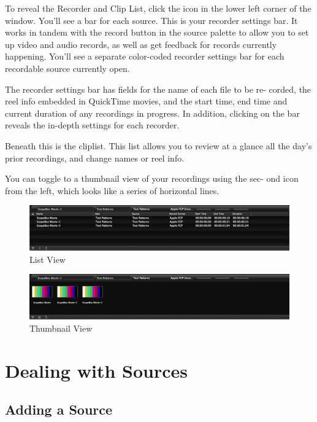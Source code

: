 \documentclass[10,letterpaper,]{report}
\begin{document}
To reveal the Recorder and Clip List, click the icon in the lower left
corner of the window. You'll see a bar for each source. This is your
recorder settings bar. It works in tandem with the record button in the
source palette to allow you to set up video and audio records, as well
as get feedback for records currently happening. You'll see a separate
color-coded recorder settings bar for each recordable source currently
open.

The recorder settings bar has fields for the name of each file to be re-
corded, the reel info embedded in QuickTime movies, and the start time,
end time and current duration of any recordings in progress. In
addition, clicking on the bar reveals the in-depth settings for each
recorder.

Beneath this is the cliplist. This list allows you to review at a glance
all the day's prior recordings, and change names or reel info.

You can toggle to a thumbnail view of your recordings using the sec- ond
icon from the left, which looks like a series of horizontal lines.

\begin{figure}[htbp]
\centering
\includegraphics{images/cliplist.png}
\caption{List View}
\end{figure}

\begin{figure}[htbp]
\centering
\includegraphics{images/thumblist.png}
\caption{Thumbnail View}
\end{figure}

\chapter{Dealing with Sources}

\section{Adding a Source}
\end{document}
